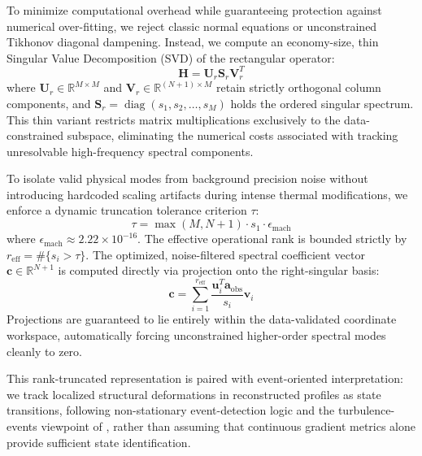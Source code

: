 \documentclass[11pt,a4paper]{article}
\begin{document}
To minimize computational overhead while guaranteeing protection against numerical over-fitting, we reject classic normal equations or unconstrained Tikhonov diagonal dampening. Instead, we compute an economy-size, thin Singular Value Decomposition (SVD) of the rectangular operator:
\begin{equation}
\mathbf{H} = \mathbf{U}_r \mathbf{S}_r \mathbf{V}_r^T
\label{eq:thin_svd}
\end{equation}
where $\mathbf{U}_r \in \mathbb{R}^{M \times M}$ and $\mathbf{V}_r \in \mathbb{R}^{(N+1) \times M}$ retain strictly orthogonal column components, and $\mathbf{S}_r = \operatorname{diag}(s_1, s_2, \ldots, s_M)$ holds the ordered singular spectrum. This thin variant restricts matrix multiplications exclusively to the data-constrained subspace, eliminating the numerical costs associated with tracking unresolvable high-frequency spectral components.

To isolate valid physical modes from background precision noise without introducing hardcoded scaling artifacts during intense thermal modifications, we enforce a dynamic truncation tolerance criterion $\tau$:
\begin{equation}
\tau = \max(M, N+1) \cdot s_1 \cdot \epsilon_{\mathrm{mach}}
\label{eq:dynamic_tolerance}
\end{equation}
where $\epsilon_{\mathrm{mach}} \approx 2.22 \times 10^{-16}$. The effective operational rank is bounded strictly by $r_{\mathrm{eff}} = \#\{s_i > \tau\}$. The optimized, noise-filtered spectral coefficient vector $\mathbf{c} \in \mathbb{R}^{N+1}$ is computed directly via projection onto the right-singular basis:
\begin{equation}
\mathbf{c} = \sum_{i=1}^{r_{\mathrm{eff}}} \frac{\mathbf{u}_i^T \mathbf{a}_{\mathrm{obs}}}{s_i} \mathbf{v}_i
\label{eq:svd_reconstruction}
\end{equation}
Projections are guaranteed to lie entirely within the data-validated coordinate workspace, automatically forcing unconstrained higher-order spectral modes cleanly to zero.

This rank-truncated representation is paired with event-oriented interpretation: we track localized structural deformations in reconstructed profiles as state transitions, following non-stationary event-detection logic \citep{Kang2014a} and the turbulence-events viewpoint of \citet{Narasimha1995}, rather than assuming that continuous gradient metrics alone provide sufficient state identification.
\end{document}
